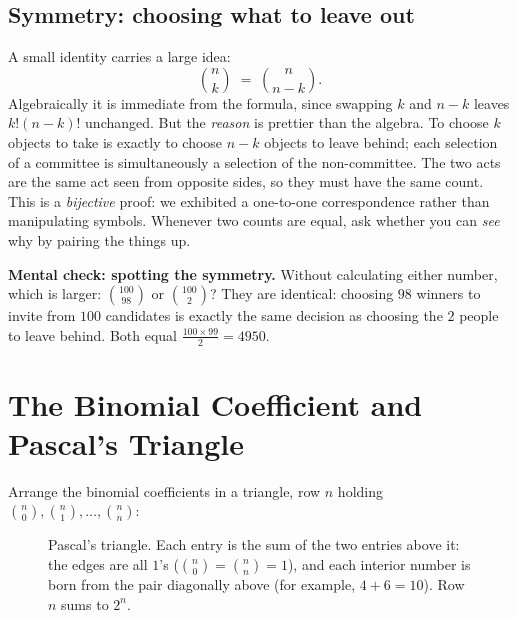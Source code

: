 \subsection{Symmetry: choosing what to leave out}

A small identity carries a large idea:
\[
  \binom{n}{k} \;=\; \binom{n}{n-k}.
\]
Algebraically it is immediate from the formula, since swapping $k$ and $n-k$ leaves
$k!(n-k)!$ unchanged. But the \emph{reason} is prettier than the algebra. To choose $k$
objects to take is exactly to choose $n-k$ objects to leave behind; each selection of a
committee is simultaneously a selection of the non-committee. The two acts are the same act
seen from opposite sides, so they must have the same count. This is a \emph{bijective}
proof: we exhibited a one-to-one correspondence rather than manipulating symbols. Whenever two counts are equal, ask
whether you can \emph{see} why by pairing the things up.

\begin{recoverybox}
\textbf{Mental check: spotting the symmetry.} Without calculating either number, which is
larger: $\binom{100}{98}$ or $\binom{100}{2}$? They are identical: choosing $98$ winners to invite
from $100$ candidates is exactly the same decision as choosing the $2$ people to leave behind.
Both equal $\frac{100 \times 99}{2} = 4950$.
\end{recoverybox}

\section{The Binomial Coefficient and Pascal's Triangle}
\label{ch2:pascal}

Arrange the binomial coefficients in a triangle, row $n$ holding $\binom{n}{0}, \binom{n}{1},
\dots, \binom{n}{n}$:

\begin{figure}[H]
\centering
{}
\caption{Pascal's triangle. Each entry is the sum of the two entries above it: the edges
are all $1$'s ($\binom{n}{0}=\binom{n}{n}=1$), and each interior number is born from the
pair diagonally above (for example, $4 + 6 = 10$). Row $n$ sums to $2^n$.}
\label{ch2:fig-pascal}
\end{figure}

